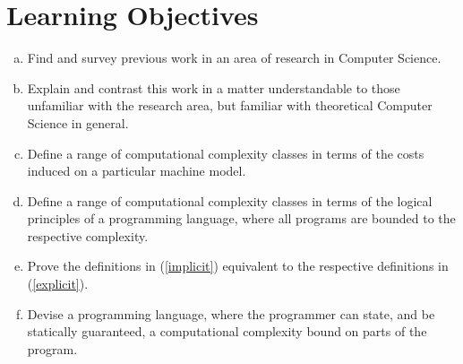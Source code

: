 
\section{Learning Objectives}

\begin{enumerate}[(a)]

\item Find and survey previous work in an area of research in Computer Science.

\item Explain and contrast this work in a matter understandable to those
unfamiliar with the research area, but familiar with theoretical Computer
Science in general.

\item Define a range of computational complexity classes in terms of the costs
induced on a particular machine model.\label{explicit}

\item Define a range of computational complexity classes in terms of the
logical principles of a programming language, where all programs are bounded to
the respective complexity.\label{implicit}

\item Prove the definitions in (\ref{implicit}) equivalent to the respective
definitions in (\ref{explicit}).

\item Devise a programming language, where the programmer can state, and be
statically guaranteed, a computational complexity bound on parts of the
program.

\end{enumerate}
